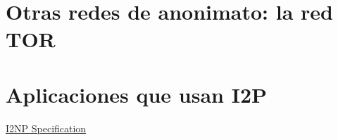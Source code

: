     \section{Otras redes de anonimato: la red TOR}
    
    
    
    
    \section{Aplicaciones que usan I2P}
    
    
   
\begin{thebibliography}{9}


   \href{https://geti2p.net/spec/i2np}{I2NP Specification}
   
  
  
  

\end{thebibliography}

